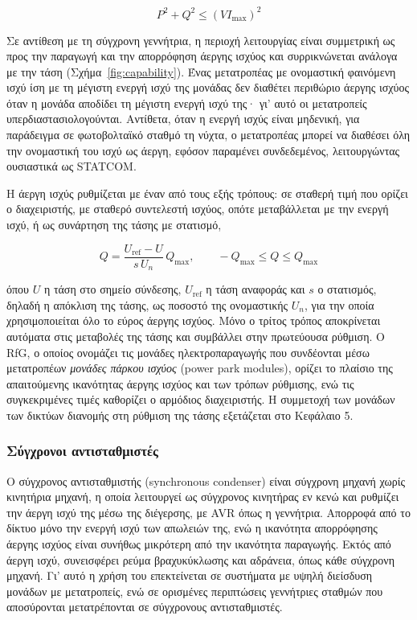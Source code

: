 \begin{equation}
P^2 + Q^2 \le \left(V I_{\max}\right)^2
\label{eq:conv-limit}
\end{equation}

Σε αντίθεση με τη σύγχρονη γεννήτρια, η περιοχή λειτουργίας είναι συμμετρική ως προς την
παραγωγή και την απορρόφηση άεργης ισχύος και συρρικνώνεται ανάλογα με την τάση
(Σχήμα~\ref{fig:capability}). Ένας μετατροπέας με ονομαστική φαινόμενη ισχύ ίση με τη μέγιστη
ενεργή ισχύ της μονάδας δεν διαθέτει περιθώριο άεργης ισχύος όταν η μονάδα αποδίδει τη
μέγιστη ενεργή ισχύ της· γι' αυτό οι μετατροπείς υπερδιαστασιολογούνται. Αντίθετα, όταν η
ενεργή ισχύς είναι μηδενική, για παράδειγμα σε φωτοβολταϊκό σταθμό τη νύχτα, ο μετατροπέας
μπορεί να διαθέσει όλη την ονομαστική του ισχύ ως άεργη, εφόσον παραμένει συνδεδεμένος,
λειτουργώντας ουσιαστικά ως STATCOM.

Η άεργη ισχύς ρυθμίζεται με έναν από τους εξής τρόπους: σε σταθερή τιμή που ορίζει ο
διαχειριστής, με σταθερό συντελεστή ισχύος, οπότε μεταβάλλεται με την ενεργή ισχύ, ή ως
συνάρτηση της τάσης με στατισμό,

\begin{equation}
Q = \frac{U_{\mathrm{ref}} - U}{s\,U_n}\,Q_{\max}, \qquad -Q_{\max} \le Q \le Q_{\max}
\label{eq:qu}
\end{equation}

όπου $U$ η τάση στο σημείο σύνδεσης, $U_{\mathrm{ref}}$ η τάση αναφοράς και $s$ ο στατισμός,
δηλαδή η απόκλιση της τάσης, ως ποσοστό της ονομαστικής $U_n$, για την οποία
χρησιμοποιείται όλο το εύρος άεργης ισχύος. Μόνο ο τρίτος τρόπος αποκρίνεται αυτόματα στις
μεταβολές της τάσης και συμβάλλει στην πρωτεύουσα ρύθμιση. Ο RfG, ο οποίος ονομάζει τις
μονάδες ηλεκτροπαραγωγής που συνδέονται μέσω μετατροπέων \emph{μονάδες πάρκου ισχύος} (power
park modules), ορίζει το πλαίσιο της απαιτούμενης ικανότητας άεργης ισχύος και των τρόπων
ρύθμισης, ενώ τις συγκεκριμένες τιμές καθορίζει ο αρμόδιος διαχειριστής. Η συμμετοχή των μονάδων των δικτύων διανομής στη ρύθμιση
της τάσης εξετάζεται στο Κεφάλαιο 5.

\subsubsection{Σύγχρονοι αντισταθμιστές}

Ο σύγχρονος αντισταθμιστής (synchronous condenser) είναι σύγχρονη μηχανή χωρίς κινητήρια
μηχανή, η οποία λειτουργεί ως σύγχρονος κινητήρας εν κενώ και ρυθμίζει την άεργη ισχύ της
μέσω της διέγερσης, με AVR όπως η γεννήτρια. Απορροφά από το δίκτυο μόνο την ενεργή ισχύ των
απωλειών της, ενώ η ικανότητα απορρόφησης άεργης ισχύος είναι συνήθως μικρότερη από την
ικανότητα παραγωγής. Εκτός από άεργη ισχύ, συνεισφέρει ρεύμα βραχυκύκλωσης και αδράνεια,
όπως κάθε σύγχρονη μηχανή. Γι' αυτό η χρήση του επεκτείνεται σε συστήματα με υψηλή διείσδυση
μονάδων με μετατροπείς, ενώ σε ορισμένες περιπτώσεις γεννήτριες σταθμών που αποσύρονται
μετατρέπονται σε σύγχρονους αντισταθμιστές.

